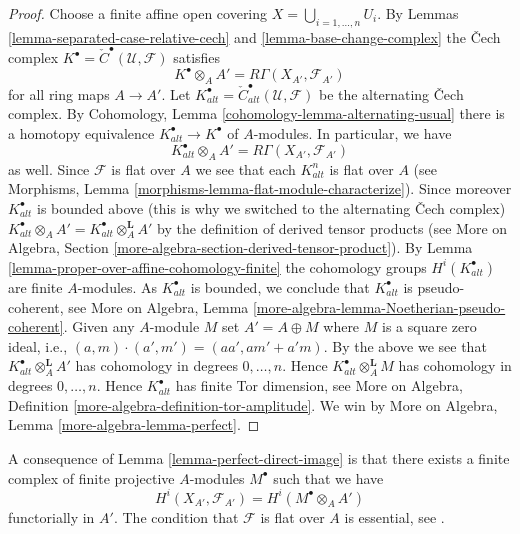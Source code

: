 \begin{proof}
Choose a finite affine open covering $X = \bigcup_{i = 1, \ldots, n} U_i$.
By Lemmas \ref{lemma-separated-case-relative-cech} and
\ref{lemma-base-change-complex} the {\v C}ech complex
$K^\bullet = {\check C}^\bullet(\mathcal{U}, \mathcal{F})$ satisfies
$$
K^\bullet \otimes_A A' = R\Gamma(X_{A'}, \mathcal{F}_{A'})
$$
for all ring maps $A \to A'$. Let
$K_{alt}^\bullet = {\check C}_{alt}^\bullet(\mathcal{U}, \mathcal{F})$
be the alternating {\v C}ech complex. By
Cohomology, Lemma \ref{cohomology-lemma-alternating-usual}
there is a homotopy equivalence $K_{alt}^\bullet \to K^\bullet$
of $A$-modules. In particular, we have
$$
K_{alt}^\bullet \otimes_A A' = R\Gamma(X_{A'}, \mathcal{F}_{A'})
$$
as well. Since $\mathcal{F}$ is flat over $A$ we see that each $K_{alt}^n$
is flat over $A$ (see
Morphisms, Lemma \ref{morphisms-lemma-flat-module-characterize}).
Since moreover $K_{alt}^\bullet$ is bounded above (this is why we switched
to the alternating {\v C}ech complex)
$K_{alt}^\bullet \otimes_A A' = K_{alt}^\bullet \otimes_A^{\mathbf{L}} A'$
by the definition of derived tensor products (see
More on Algebra, Section \ref{more-algebra-section-derived-tensor-product}).
By
Lemma \ref{lemma-proper-over-affine-cohomology-finite}
the cohomology groups $H^i(K_{alt}^\bullet)$ are finite $A$-modules.
As $K_{alt}^\bullet$ is bounded, we conclude that $K_{alt}^\bullet$
is pseudo-coherent, see
More on Algebra, Lemma \ref{more-algebra-lemma-Noetherian-pseudo-coherent}.
Given any $A$-module $M$ set $A' = A \oplus M$ where $M$ is a square zero
ideal, i.e., $(a, m) \cdot (a', m') = (aa', am' + a'm)$. By the
above we see that $K_{alt}^\bullet \otimes_A^\mathbf{L} A'$ has cohomology
in degrees $0, \ldots, n$. Hence $K_{alt}^\bullet \otimes_A^\mathbf{L} M$
has cohomology in degrees $0, \ldots, n$. Hence $K_{alt}^\bullet$ has
finite Tor dimension, see
More on Algebra, Definition \ref{more-algebra-definition-tor-amplitude}.
We win by More on Algebra, Lemma \ref{more-algebra-lemma-perfect}.
\end{proof}

\begin{remark}
\label{remark-explain-perfect-direct-image}
A consequence of Lemma \ref{lemma-perfect-direct-image} is that there
exists a finite complex of finite projective $A$-modules $M^\bullet$ such
that we have
$$
H^i(X_{A'}, \mathcal{F}_{A'}) = H^i(M^\bullet \otimes_A A')
$$
functorially in $A'$. The condition that $\mathcal{F}$ is
flat over $A$ is essential, see \cite{Hartshorne}.
\end{remark}







